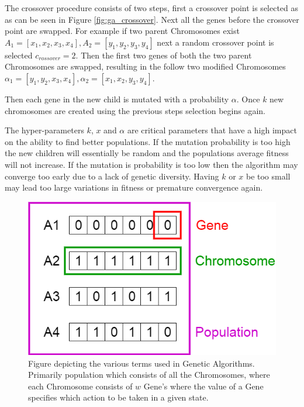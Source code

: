 \documentclass[10pt, a4paper, twocolumn]{article}
\begin{document}
The crossover procedure consists of two steps, first a crossover point is selected as as can be seen in Figure \ref{fig:ga_crossover}. Next all the genes before the crossover point are swapped. For example if two parent Chromosomes exist $A_1 = [x_1, x_2, x_3, x_4], A_2 = [y_1, y_2, y_3, y_4]$ next a random crossover point is selected $c_{rossover} = 2$. Then the first two genes of both the two parent Chromosomes are swapped, resulting in the follow two modified Chromosomes $\alpha_1 = [y_1, y_2, x_3, x_4], \alpha_2 = [x_1, x_2, y_3, y_4]$. 

Then each gene in the new child is mutated with a probability $\alpha$. Once $k$ new chromosomes are created using the previous steps selection begins again. 

The hyper-parameters $k$, $x$ and $\alpha$ are critical parameters that have a high impact on the ability to find better populations. If the mutation probability is too high the new children will essentially be random and the populations average fitness will not increase. If the mutation is probability is too low then the algorithm may converge too early due to a lack of genetic diversity. Having $k$ or $x$ be too small may lead too large variations in fitness or premature convergence again. 


\begin{figure}[H]
\centerline{\includegraphics[scale=0.25]{ga_population}}
\caption{Figure depicting the various terms used in Genetic Algorithms. Primarily population which consists of all the Chromosomes, where each Chromosome consists of $w$ Gene's where the value of a Gene specifies which action to be taken in a given state.}
\label{fig:ga_population}
\end{figure}
\end{document}
